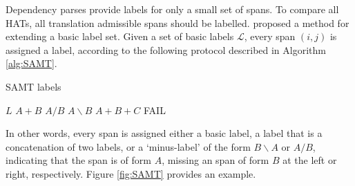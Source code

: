 Dependency parses provide labels for only a small set of spans. To compare all HATs, all translation admissible spans should be labelled. \cite{zollmann2006syntax} proposed a method for extending a basic label set. Given a set of basic labels $\mathcal{L}$, every span $(i,j)$ is assigned a label, according to the following protocol described in Algorithm \ref{alg:SAMT}.

\begin{algorithm}\label{alg:SAMT}
\caption{SAMT labels}
\begin{algorithmic}
	\RETURN $L$
	\RETURN $A+B$
	\RETURN $A/B$
	\RETURN $A\backslash B$
	\RETURN $A+B+C$
\ELSE
	\RETURN FAIL
\ENDIF
\end{algorithmic}
\end{algorithm}

In other words, every span is assigned either a basic label, a label that is a concatenation of two labels, or a `minus-label' of the form $B\backslash A$ or $A/B$, indicating that the span is of form $A$, missing an span of form $B$ at the left or right, respectively. Figure \ref{fig:SAMT} provides an example.

